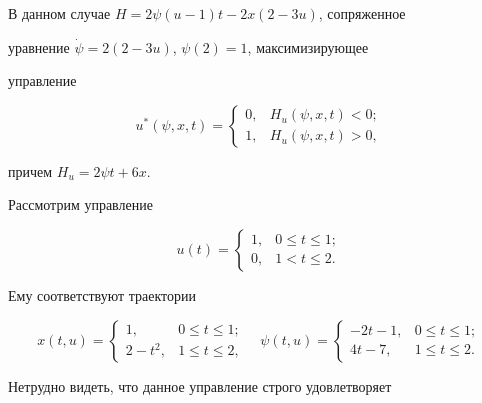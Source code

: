 В данном случае $H = 2 \psi(u - 1)t - 2x(2 - 3u)$, сопряженное


уравнение $\Dot{\psi} = 2(2 - 3u)$, $\psi(2) = 1$, максимизирующее


управление


$$


u^{*}(\psi, x, t) =


\begin{cases}


0, & H_{u}(\psi, x, t) < 0; \\


1, & H_{u}(\psi, x, t) > 0,


\end{cases}


$$


причем $H_{u} = 2\psi t + 6x$.





Рассмотрим управление


$$


u(t) =


\begin{cases}


1, & 0 \leq t \leq 1;\\


0, & 1 < t \leq 2.


\end{cases}


$$


Ему соответствуют траектории


$$


x(t, u) =


\begin{cases}


1, & 0 \leq t \leq 1;\\


2 - t^{2}, & 1 \leq t \leq 2,


\end{cases}\quad


\psi(t, u) =


\begin{cases}


- 2t - 1, & 0 \leq t \leq 1;\\


4t - 7, & 1 \leq t \leq 2.


\end{cases}


$$


Нетрудно видеть, что данное управление строго удовлетворяет 


